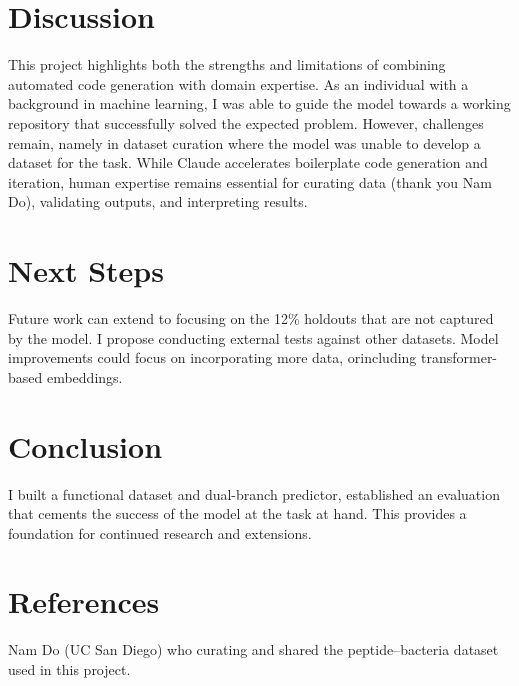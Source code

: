\documentclass{article}
\begin{document}
\section{Discussion}
This project highlights both the strengths and limitations of combining automated code generation with domain expertise. As an individual with a background in machine learning, I was able to guide the model towards a working repository that successfully solved the expected problem. However, challenges remain, namely in dataset curation where the model was unable to develop a dataset for the task. While Claude accelerates boilerplate code generation and iteration, human expertise remains essential for curating data (thank you Nam Do), validating outputs, and interpreting results. 

\section{Next Steps}
Future work can extend to focusing on the 12\% holdouts that are not captured by the model. I propose conducting external tests against other datasets. Model improvements could focus on incorporating more data, orincluding transformer-based embeddings. 

\section{Conclusion}
I built a functional dataset and dual-branch predictor, established an evaluation that cements the success of the model at the task at hand. This provides a foundation for continued research and extensions.

\section*{References}
Nam Do (UC San Diego) who curating and shared the peptide–bacteria dataset used in this project.
\end{document}
